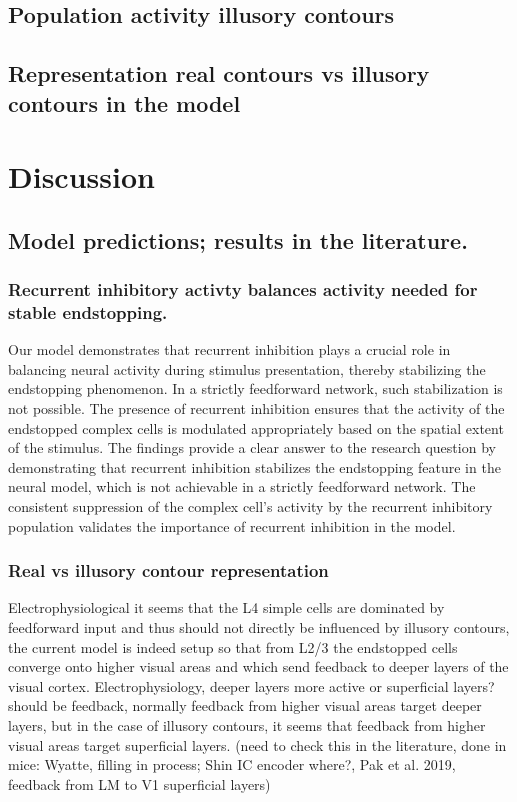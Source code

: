 \documentclass[12pt]{article}
\begin{document}
\subsection{Population activity illusory contours}

\subsection{Representation real contours vs illusory contours in the model}


\newpage
\section{Discussion}

\subsection{Model predictions; results in the literature.}
  \subsubsection{Recurrent inhibitory activty balances activity needed for stable endstopping.}
  Our model demonstrates that recurrent inhibition plays a crucial role in balancing neural activity during stimulus presentation, thereby stabilizing the endstopping phenomenon. In a strictly feedforward network, such stabilization is not possible. The presence of recurrent inhibition ensures that the activity of the endstopped complex cells is modulated appropriately based on the spatial extent of the stimulus. The findings provide a clear answer to the research question by demonstrating that recurrent inhibition stabilizes the endstopping feature in the neural model, which is not achievable in a strictly feedforward network. The consistent suppression of the complex cell's activity by the recurrent inhibitory population validates the importance of recurrent inhibition in the model.

  \subsubsection{Real vs illusory contour representation}
  Electrophysiological it seems that the L4 simple cells are dominated by feedforward input and thus should not directly be influenced by illusory contours, the current model is indeed setup so that from L2/3 the endstopped cells converge onto higher visual areas and which send feedback to deeper layers of the visual cortex. 
  Electrophysiology, deeper layers more active or superficial layers? should be feedback, normally feedback from higher visual areas target deeper layers, but in the case of illusory contours, it seems that feedback from higher visual areas target superficial layers. (need to check this in the literature, done in mice: Wyatte, filling in process; Shin IC encoder where?, Pak et al. 2019, feedback from LM to V1 superficial layers)
\end{document}

